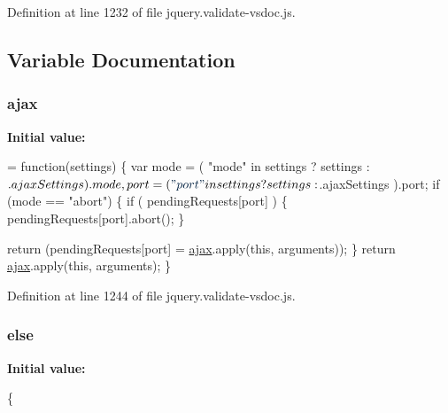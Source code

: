 {Definition at line 1232 of file jquery.\+validate-\/vsdoc.\+js.



\subsection{Variable Documentation}
\subsubsection[{\texorpdfstring{ajax}{ajax}}]{\setlength{\rightskip}{0pt plus 5cm}ajax}\hypertarget{jquery_8validate-vsdoc_8js_a77004c0fdc08a5bc07afa0b099cdf6df}{}\label{jquery_8validate-vsdoc_8js_a77004c0fdc08a5bc07afa0b099cdf6df}
{\bfseries Initial value\+:}
\begin{DoxyCode}
= \textcolor{keyword}{function}(settings) \{
            var mode = ( \textcolor{stringliteral}{"mode"} in settings ? settings : $.ajaxSettings ).mode,
                port = ( \textcolor{stringliteral}{"port"} in settings ? settings : $.ajaxSettings ).port;
            \textcolor{keywordflow}{if} (mode == \textcolor{stringliteral}{"abort"}) \{
                \textcolor{keywordflow}{if} ( pendingRequests[port] ) \{
                    pendingRequests[port].abort();
                \}

                \textcolor{keywordflow}{return} (pendingRequests[port] = \hyperlink{jquery_8validate-vsdoc_8js_a77004c0fdc08a5bc07afa0b099cdf6df}{ajax}.apply(\textcolor{keyword}{this}, arguments));
            \}
            \textcolor{keywordflow}{return} \hyperlink{jquery_8validate-vsdoc_8js_a77004c0fdc08a5bc07afa0b099cdf6df}{ajax}.apply(\textcolor{keyword}{this}, arguments);
        \}
\end{DoxyCode}


Definition at line 1244 of file jquery.\+validate-\/vsdoc.\+js.

\subsubsection[{\texorpdfstring{else}{else}}]{\setlength{\rightskip}{0pt plus 5cm}else}\hypertarget{jquery_8validate-vsdoc_8js_a0544c3fe466e421738dae463968b70ba}{}\label{jquery_8validate-vsdoc_8js_a0544c3fe466e421738dae463968b70ba}
{\bfseries Initial value\+:}
\begin{DoxyCode}
\{
        

\end{DoxyCode}}
